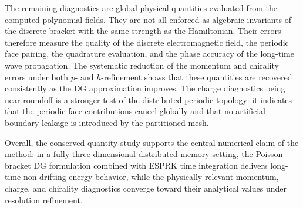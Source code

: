 \documentclass[11pt]{article}
\begin{document}
The remaining diagnostics are global physical quantities evaluated from the
computed polynomial fields.  They are not all enforced as algebraic invariants
of the discrete bracket with the same strength as the Hamiltonian.  Their errors
therefore measure the quality of the discrete electromagnetic field, the
periodic face pairing, the quadrature evaluation, and the phase accuracy of the
long-time wave propagation.  The systematic reduction of the momentum and
chirality errors under both $p$- and $h$-refinement shows that these quantities
are recovered consistently as the DG approximation improves.  The charge
diagnostics being near roundoff is a stronger test of the distributed periodic
topology: it indicates that the periodic face contributions cancel globally and
that no artificial boundary leakage is introduced by the partitioned mesh.

Overall, the conserved-quantity study supports the central numerical claim of
the method: in a fully three-dimensional distributed-memory setting, the
Poisson-bracket DG formulation combined with ESPRK time integration delivers
long-time non-drifting energy behavior, while the physically relevant momentum,
charge, and chirality diagnostics converge toward their analytical values under
resolution refinement.
\end{document}
